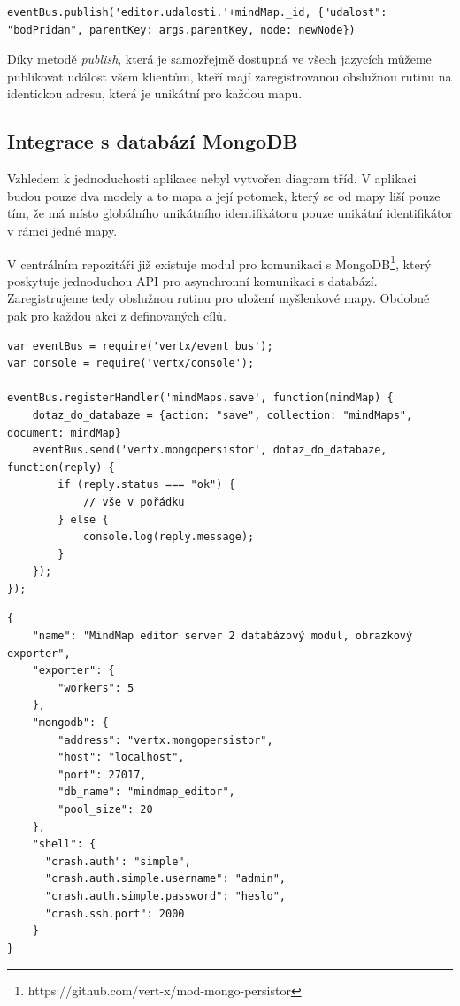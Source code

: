 \begin{lstlisting}[caption=Publikování zprávy v jazyce JavaScript]
eventBus.publish('editor.udalosti.'+mindMap._id, {"udalost": "bodPridan", parentKey: args.parentKey, node: newNode})
\end{lstlisting}

Díky metodě \emph{publish}, která je samozřejmě dostupná ve všech jazycích můžeme publikovat událost všem klientům, kteří mají zaregistrovanou obslužnou rutinu na identickou adresu, která je unikátní pro každou mapu.

\subsection{Integrace s databází MongoDB}

Vzhledem k jednoduchosti aplikace nebyl vytvořen diagram tříd. V aplikaci budou pouze dva modely a to mapa a její potomek, který se od mapy liší pouze tím, že má místo globálního unikátního identifikátoru pouze unikátní identifikátor v rámci jedné mapy.

V centrálním repozitáři již existuje modul pro komunikaci s MongoDB\footnote{https://github.com/vert-x/mod-mongo-persistor}, který poskytuje jednoduchou API pro asynchronní komunikaci s databází. Zaregistrujeme tedy obslužnou rutinu pro uložení myšlenkové mapy. Obdobně pak pro každou akci z definovaných cílů.

\begin{lstlisting}[caption=Uložení myšlenkové mapy do databáze]
var eventBus = require('vertx/event_bus');
var console = require('vertx/console');

eventBus.registerHandler('mindMaps.save', function(mindMap) {
	dotaz_do_databaze = {action: "save", collection: "mindMaps", document: mindMap}
	eventBus.send('vertx.mongopersistor', dotaz_do_databaze, function(reply) {
		if (reply.status === "ok") {
			// vše v pořádku
		} else {
			console.log(reply.message);
		}
	});
});

\end{lstlisting}

\begin{lstlisting}[caption={Konfigurace serveru 2},label=confServ2]
{
    "name": "MindMap editor server 2 databázový modul, obrazkový exporter",
    "exporter": {
        "workers": 5
    },
    "mongodb": {
        "address": "vertx.mongopersistor",
        "host": "localhost",
        "port": 27017,
        "db_name": "mindmap_editor",
        "pool_size": 20
    },
    "shell": {
      "crash.auth": "simple",
      "crash.auth.simple.username": "admin",
      "crash.auth.simple.password": "heslo",
      "crash.ssh.port": 2000
    }
}
\end{lstlisting}

